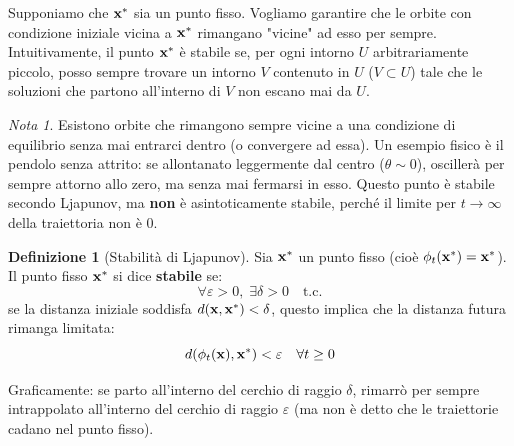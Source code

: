 \documentclass[openany]{book}
\theoremstyle{definition}
\newtheorem*{definizione}{Definizione}
\theoremstyle{remark}
\newtheorem*{nota}{Nota}
\begin{document}
Supponiamo che $\vb{x}^*$ sia un punto fisso. Vogliamo garantire che le orbite con condizione iniziale vicina a $\vb{x}^*$ rimangano "vicine" ad esso per sempre. Intuitivamente, il punto $\vb{x}^*$ è stabile se, per ogni intorno $U$ arbitrariamente piccolo, posso sempre trovare un intorno $V$ contenuto in $U$ ($V \subset U$) tale che le soluzioni che partono all'interno di $V$ non escano mai da $U$.

\begin{nota}
Esistono orbite che rimangono sempre vicine a una condizione di equilibrio senza mai entrarci dentro (o convergere ad essa). Un esempio fisico è il pendolo senza attrito: se allontanato leggermente dal centro ($\theta \sim 0$), oscillerà per sempre attorno allo zero, ma senza mai fermarsi in esso. Questo punto è stabile secondo Ljapunov, ma \textbf{non} è asintoticamente stabile, perché il limite per $t \to \infty$ della traiettoria non è $0$.
\end{nota}

\begin{definizione}[Stabilità di Ljapunov]
Sia $\vb{x}^*$ un punto fisso (cioè $\phi_t(\vb{x}^*) = \vb{x}^*$). 
Il punto fisso $\vb{x}^*$ si dice \textbf{stabile} se:
$$ \forall \varepsilon > 0, \; \exists \delta > 0 \quad \text{t.c.} $$
se la distanza iniziale soddisfa $d(\vb{x}, \vb{x}^*) < \delta$, questo implica che la distanza futura rimanga limitata:
$$ d(\phi_t(\vb{x}), \vb{x}^*) < \varepsilon \quad \forall t \ge 0 $$
\end{definizione}

\begin{center}
\end{center}
Graficamente: se parto all'interno del cerchio di raggio $\delta$, rimarrò per sempre intrappolato all'interno del cerchio di raggio $\varepsilon$ (ma non è detto che le traiettorie cadano nel punto fisso).
\end{document}
